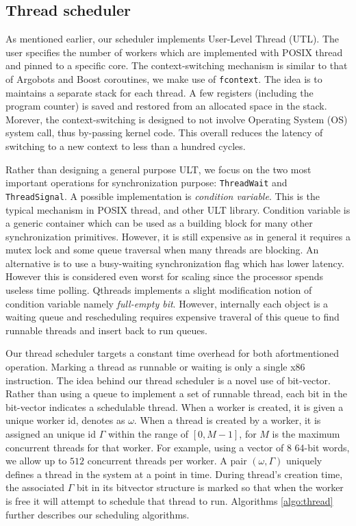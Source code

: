\subsection{Thread scheduler}
As mentioned earlier, our scheduler implements User-Level Thread (UTL). The
user specifies the number of workers which are implemented with POSIX thread
and pinned to a specific core. The context-switching mechanism is similar to
that of Argobots and Boost coroutines, we make use of \texttt{fcontext}. The
idea is to maintains a separate stack for each thread. A few registers
(including the program counter) is saved and restored from an allocated space
in the stack. Morever, the context-switching is designed to not involve
Operating System (OS) system call, thus by-passing kernel code. This overall
reduces the latency of switching to a new context to less than a hundred
cycles.

Rather than designing a general purpose ULT, we focus on the two most important
operations for synchronization purpose: \texttt{ThreadWait} and
\texttt{ThreadSignal}. A possible implementation is \textit{condition
variable}. This is the typical mechanism in POSIX thread, and other ULT
library.  Condition variable is a generic container which can
be used as a building block for many other synchronization primitives. However,
it is still expensive as in general it requires a mutex lock and some queue
traversal when many threads are blocking.  An alternative is to use a
busy-waiting synchronization flag which has lower latency. However this is
considered even worst for scaling since the processor spends useless time
polling. Qthreads implements a slight modification notion of condition variable
namely \textit{full-empty bit}. However, internally each object is a waiting
queue and rescheduling requires expensive traveral of this queue to find
runnable threads and insert back to run queues.

Our thread scheduler targets a constant time overhead for both afortmentioned
operation. Marking a thread as runnable or waiting is only a single x86
instruction. The idea behind our thread scheduler is a novel use of bit-vector.
Rather than using a queue to implement a set of runnable thread, each bit in
the bit-vector indicates a schedulable thread. When a worker is created, it is
given a unique worker id, denotes as $\omega$.  When a thread is created by a
worker, it is assigned an unique id $\Gamma$ within the range of $[0,M-1]$, for
$M$ is the maximum concurrent threads for that worker.  For example, using a
vector of $8$ 64-bit words, we allow up to $512$ concurrent threads per worker.
A pair $(\omega, \Gamma)$ uniquely defines a thread in the system at a point in
time. During thread's creation time, the associated $\Gamma$ bit in its
bitvector structure is marked so that when the worker is free it will attempt
to schedule that thread to run. Algorithms \ref{algo:thread} further describes
our scheduling algorithms. 

